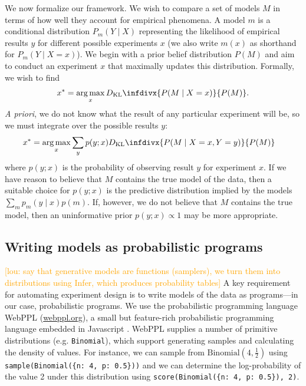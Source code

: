 \documentclass{article}
\newcommand{\dkl}{D_\mathrm{KL}\infdivx}
\newcommand{\lou}[1]{\textcolor{orange}{[lou: #1]}}
\DeclareMathOperator*{\argmax}{arg\,max}
\begin{document}
We now formalize our framework.
We wish to compare a set of models $M$ in terms of how well they account for empirical phenomena.
A model $m$ is a conditional distribution $P_m(Y \mid X)$ representing the likelihood of empirical results $y$ for different possible experiments $x$ (we also write $m(x)$ as shorthand for $P_m(Y \mid X = x)$).
We begin with a prior belief distribution $P(M)$ and aim to conduct an experiment $x$ that maximally updates this distribution.
Formally, we wish to find
$$x^{*} = \argmax_{x} \dkl{ P(M \mid X = x) }{ P(M) }.$$
\emph{A priori}, we do not know what the result of any particular experiment will be, so we must integrate over the possible results $y$:
\begin{align}
  x^{*} &= \argmax_{x} \sum\limits_{y}p(y ; x) \dkl{ P(M \mid X = x, Y = y) }{ P(M) }  \label{eq:oed}
\end{align}
where $p(y ; x)$ is the probability of observing result $y$ for experiment $x$.
If we have reason to believe that $M$ contains the true model of the data, then a suitable choice for $p(y ; x)$ is the predictive distribution implied by the models $ \sum\limits_{m}p_m(y \mid x)p(m) $.
If, however, we do not believe that $M$ contains the true model, then an uninformative prior $p(y ; x) \propto 1$ may be more appropriate.

\subsection{Writing models as probabilistic programs}

\lou{say that generative models are functions (samplers), we turn them into distributions using Infer, which produces probability tables}
A key requirement for automating experiment design is to write models of the data as programs---in our case, probabilistic programs.
We use the probabilistic programming language WebPPL (\url{webppl.org}), a small but feature-rich probabilistic programming language embedded in Javascript \cite{dippl}.
WebPPL supplies a number of primitive distributions (e.g. \lstinline{Binomial}), which  support generating samples and calculating the density of values.
For instance, we can sample from $\text{Binomial}(4, \frac{1}{2})$ using \lstinline|sample(Binomial({n: 4, p: 0.5}))| and we can determine the log-probability of the value 2 under this distribution using \lstinline|score(Binomial({n: 4, p: 0.5}), 2)|.
\end{document}
